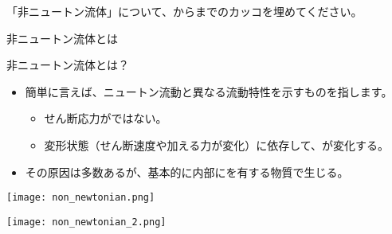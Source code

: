 \documentclass[uplatex,dvipdfmx,a4paper,11pt]{jsarticle}
\begin{document}
\begin{qlist}
	\qitem 「非ニュートン流体」について、からまでのカッコを埋めてください。

			\vspace{3mm}
			\begin{qlist2}
			\qitem 非ニュートン流体とは
			\begin{center}
				\begin{minipage}{0.9\textwidth}
					\begin{itembox}[l]{非ニュートン流体とは？}
						\begin{itemize}
							\item 簡単に言えば、ニュートン流動と異なる流動特性を示すものを指します。
							\begin{itemize}
								\item せん断応力が\qbox{}ではない。
								\item 変形状態（せん断速度や加える力が変化）に依存して、\qbox{}が変化する。
							\end{itemize}
							\item その原因は多数あるが、基本的に内部に\qbox{}を有する物質で生じる。
						\end{itemize}
					\end{itembox}
				\end{minipage}

				\vspace{4mm}

				\begin{minipage}{0.43\textwidth}
					\begin{center}
					\texttt{[image: non\_newtonian.png]}
					\end{center}
				\end{minipage}
				\begin{minipage}{0.43\textwidth}
					\begin{center}
					\texttt{[image: non\_newtonian\_2.png]}
					\end{center}
				\end{minipage}
			\end{center}


\end{qlist2}
\end{qlist}
\end{document}
